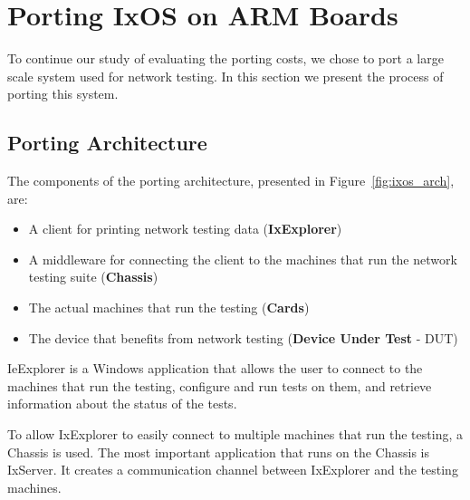 \chapter{Porting IxOS on ARM Boards} \label{sec:portingIxos}

To continue our study of evaluating the porting costs, we chose to port a large
scale system used for network testing. In this section we present the
process of porting this system. 

\section{Porting Architecture}

The components of the porting architecture, presented in
Figure~\ref{fig:ixos_arch}, are:
\begin{itemize}
    \item A client for printing network testing data (\textbf{IxExplorer})
    \item A middleware for connecting the client to the machines that run the
    network testing suite (\textbf{Chassis})
    \item The actual machines that run the testing (\textbf{Cards})
    \item The device that benefits from network testing (\textbf{Device Under Test} - DUT)
\end{itemize}


IeExplorer is a Windows application that allows the user to connect to the
machines that run the testing, configure and run tests on them, and retrieve
information about the status of the tests.

To allow IxExplorer to easily connect to multiple machines that run the testing,
a Chassis is used. The most important application that runs on the Chassis is
IxServer. It creates a communication channel between IxExplorer and the testing
machines.



